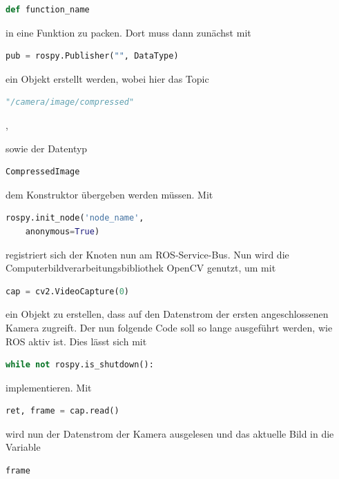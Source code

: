 \begin{lstlisting}[language=Python]
def function_name
\end{lstlisting}

in eine Funktion zu packen. Dort muss dann zunächst mit 

\begin{lstlisting}[language=Python]
pub = rospy.Publisher("", DataType)
\end{lstlisting}

ein Objekt erstellt werden, wobei hier das Topic 

\begin{lstlisting}[language=Python]
"/camera/image/compressed"
\end{lstlisting}, 

sowie der Datentyp 

\begin{lstlisting}[language=Python]
CompressedImage
\end{lstlisting} 

dem Konstruktor übergeben werden müssen. Mit 

\begin{lstlisting}[language=Python]
rospy.init_node('node_name', 
	anonymous=True)
\end{lstlisting}

registriert sich der Knoten nun am ROS-Service-Bus. Nun wird die Computerbildverarbeitungsbibliothek OpenCV genutzt, um mit 

\begin{lstlisting}[language=Python]
cap = cv2.VideoCapture(0)
\end{lstlisting}

ein Objekt zu erstellen, dass auf den Datenstrom der ersten angeschlossenen Kamera zugreift. Der nun folgende Code soll so lange ausgeführt werden, wie ROS aktiv ist. Dies lässt sich mit 

\begin{lstlisting}[language=Python]
while not rospy.is_shutdown():
\end{lstlisting}

implementieren. Mit 

\begin{lstlisting}[language=Python]
ret, frame = cap.read()
\end{lstlisting}

wird nun der Datenstrom der Kamera ausgelesen und das aktuelle Bild in die Variable 

\begin{lstlisting}[language=Python]
frame
\end{lstlisting}

